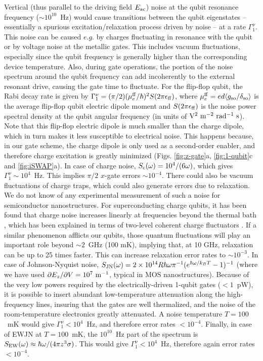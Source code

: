 \documentclass[aps,prb,superscriptaddress,nobibnotes,twocolumn]{revtex4-1}
\begin{document}
Vertical (thus parallel to the driving field $E_{\rm ac}$) noise at the qubit resonance frequency ($\sim 10^{10}$~Hz) would cause transitions between the qubit eigenstates -- essentially a spurious excitation/relaxation process driven by noise -- at a rate $\Gamma_1^{\nu}$. This noise can be caused $e.g.$ by charges fluctuating in resonance with the qubit or by voltage noise at the metallic gates. This includes vacuum fluctuations, especially since the qubit frequency is generally higher than the corresponding device temperature. Also, during gate operations, the portion of the noise spectrum %
around the qubit frequency can add incoherently to the external resonant drive, causing the gate time to fluctuate. For the flip-flop qubit, the Rabi decay rate is given by $\Gamma_1^\nu=(\pi/2)(\mu_e^{\rm ff}/\hbar)^2S(2\pi\epsilon_{\rm ff})$, where $\mu_e^{\rm ff}=ed\langle g_{\rm so}/\delta_{\rm so}\rangle$ is the average flip-flop qubit electric dipole moment and $S(2\pi\epsilon_{\rm ff})$ is the noise power spectral density at the qubit angular frequency (in units of ${\rm V^2~m^{-2}~rad^{-1}~s}$). Note that this flip-flop electric dipole is much smaller than the charge dipole, which in turn makes it less susceptible to electrical noise. This happens because, in our gate scheme, the charge dipole is only used as a second-order enabler, and therefore charge excitation is greatly minimized (Figs. \ref{fig:z-gate}a, \ref{fig:1-qubit}c and \ref{fig:iSWAP}a). In case of charge noise, $S_{\rm c}(\omega)=10^4/(6\omega)$, which gives $\Gamma_1^\nu\sim10^4$~Hz. This implies $\pi/2$ $x$-gate errors $\sim10^{-4}$. There could also be vacuum fluctuations of charge traps, which could also generate errors due to relaxation. We do not know of any experimental measurement of such a noise for semiconductor nanostructures. For superconducting charge qubits, it has been found that charge noise increases linearly at frequencies beyond the thermal bath \cite{Astafiev2004S}, which has been explained in terms of two-level coherent charge fluctuators \cite{Shnirman2005S}. If a similar phenomenon afflicts our qubits, those quantum fluctuations will play an important role beyond $\sim2$~GHz (100 mK), implying that, at 10 GHz, relaxation can be up to 25 times faster. This can increase relaxation error rates to $\sim10^{-3}$. In case of Johnson-Nyquist noise, $S_{\rm JN}(\omega)= 2\times10^{14}R\hbar\omega\pi^{-1}(e^{\hbar\omega/k_BT}-1)^{-1}$ (where we have used $\partial E_z/\partial V=10^7~{\rm m^{-1}}$, typical in MOS nanostructures). Because of the very low powers required by the electrically-driven 1-qubit gates ($<1$~pW), it is possible to insert abundant low-temperature attenuation along the high-frequency lines, insuring that the gates are well thermalized, and the noise of the room-temperature electronics greatly attenuated. A noise temperature $T=100$~mK would give $\Gamma_1^\nu<10^4$~Hz, and therefore error rates $<10^{-4}$. Finally, in case of EWJN at $T=100$~mK, the $10^{10}$~Hz part of the spectrum is \cite{Henkel1999S,Poudel2013S} $S_{\rm EW}(\omega)\approx\hbar\omega/(4\pi z^3\sigma)$. This would give $\Gamma_1^\nu<10^4$~Hz, therefore again error rates $<10^{-4}$.
\end{document}
